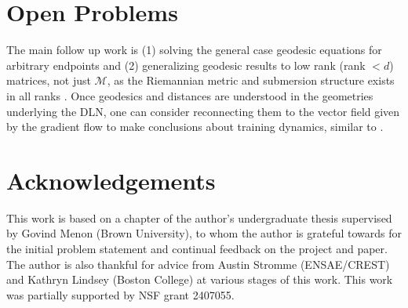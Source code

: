 \documentclass{amsart}
\theoremstyle{definition}
\theoremstyle{remark}
\numberwithin{equation}{section}
\begin{document}
\section{Open Problems} 
The main follow up work is (1) solving  the general case geodesic equations for arbitrary endpoints and (2) generalizing geodesic results to low rank (rank $< d$) matrices, not just $\mathcal{M}$, as the Riemannian metric and submersion structure exists in all ranks \cite{bah2022learning, menon2025entropy, tianmin2024}. Once geodesics and distances are understood in the geometries underlying the DLN, one can consider reconnecting them to the vector field given by the gradient flow to make conclusions about training dynamics, similar to \cite[Section 3.3]{karmarkar1990riemannian}.
\section*{Acknowledgements}
This work is based on a chapter of the author’s undergraduate thesis supervised by Govind Menon (Brown University), to whom the author is grateful towards for the initial problem statement and continual feedback on the project and paper. The author is also thankful for advice from Austin Stromme (ENSAE/CREST) and Kathryn Lindsey (Boston College) at various stages of this work. This work was partially supported by NSF grant 2407055.


\end{document}
